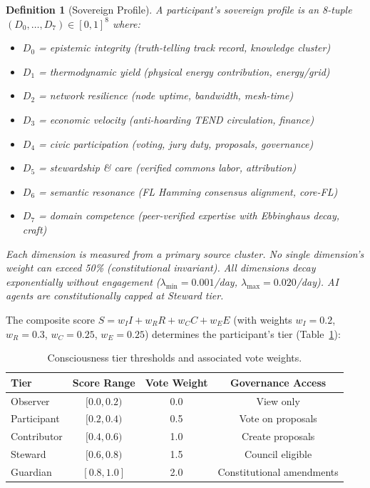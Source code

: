 \documentclass[11pt,a4paper]{article}
\newtheorem{definition}{Definition}
\begin{document}
\begin{definition}[Sovereign Profile]
A participant's sovereign profile is an 8-tuple $(D_0, \ldots, D_7) \in [0,1]^8$ where:
\begin{itemize}
  \item $D_0$ = epistemic integrity (truth-telling track record, knowledge cluster)
  \item $D_1$ = thermodynamic yield (physical energy contribution, energy/grid)
  \item $D_2$ = network resilience (node uptime, bandwidth, mesh-time)
  \item $D_3$ = economic velocity (anti-hoarding TEND circulation, finance)
  \item $D_4$ = civic participation (voting, jury duty, proposals, governance)
  \item $D_5$ = stewardship \& care (verified commons labor, attribution)
  \item $D_6$ = semantic resonance (FL Hamming consensus alignment, core-FL)
  \item $D_7$ = domain competence (peer-verified expertise with Ebbinghaus decay, craft)
\end{itemize}
Each dimension is measured from a primary source cluster. No single dimension's weight can exceed 50\% (constitutional invariant). All dimensions decay exponentially without engagement ($\lambda_{\min} = 0.001$/day, $\lambda_{\max} = 0.020$/day). AI agents are constitutionally capped at Steward tier.
\end{definition}

The composite score $S = w_I I + w_R R + w_C C + w_E E$ (with weights $w_I = 0.2$, $w_R = 0.3$, $w_C = 0.25$, $w_E = 0.25$) determines the participant's tier (Table~\ref{tab:tiers}):

\begin{table}[h]
\centering
\caption{Consciousness tier thresholds and associated vote weights.}
\label{tab:tiers}
\begin{tabular}{lccc}
\toprule
\textbf{Tier} & \textbf{Score Range} & \textbf{Vote Weight} & \textbf{Governance Access} \\
\midrule
Observer  & $[0.0, 0.2)$ & 0.0 & View only \\
Participant & $[0.2, 0.4)$ & 0.5 & Vote on proposals \\
Contributor & $[0.4, 0.6)$ & 1.0 & Create proposals \\
Steward     & $[0.6, 0.8)$ & 1.5 & Council eligible \\
Guardian    & $[0.8, 1.0]$ & 2.0 & Constitutional amendments \\
\bottomrule
\end{tabular}
\end{table}
\end{document}
